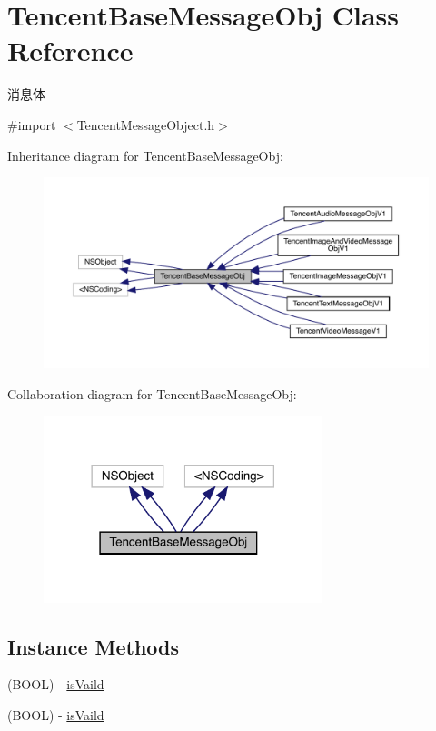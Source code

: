 \hypertarget{interface_tencent_base_message_obj}{}\section{Tencent\+Base\+Message\+Obj Class Reference}
\label{interface_tencent_base_message_obj}


消息体  




{\ttfamily \#import $<$Tencent\+Message\+Object.\+h$>$}



Inheritance diagram for Tencent\+Base\+Message\+Obj\+:\nopagebreak
\begin{figure}[H]
\begin{center}
\leavevmode
\includegraphics[width=350pt]{interface_tencent_base_message_obj__inherit__graph}
\end{center}
\end{figure}


Collaboration diagram for Tencent\+Base\+Message\+Obj\+:\nopagebreak
\begin{figure}[H]
\begin{center}
\leavevmode
\includegraphics[width=230pt]{interface_tencent_base_message_obj__coll__graph}
\end{center}
\end{figure}
\subsection*{Instance Methods}
\begin{DoxyCompactItemize}
\item 
(B\+O\+OL) -\/ \mbox{\hyperlink{interface_tencent_base_message_obj_ac77da86a7f7b85a99a40360bb8212cf6}{is\+Vaild}}
\item 
(B\+O\+OL) -\/ \mbox{\hyperlink{interface_tencent_base_message_obj_ac77da86a7f7b85a99a40360bb8212cf6}{is\+Vaild}}
\end{DoxyCompactItemize}
